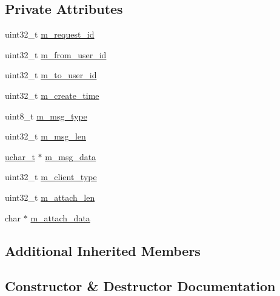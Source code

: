 \subsection*{Private Attributes}
\begin{DoxyCompactItemize}
\item 
uint32\+\_\+t \hyperlink{class_c_im_pdu_msg_data_a09b278fb291db3ac9e1a912ce2835b50}{m\+\_\+request\+\_\+id}
\item 
uint32\+\_\+t \hyperlink{class_c_im_pdu_msg_data_adf04af5060f9f17f9907c4111a5ec05a}{m\+\_\+from\+\_\+user\+\_\+id}
\item 
uint32\+\_\+t \hyperlink{class_c_im_pdu_msg_data_a0e5ed249696472f3feef4a7b4e54f7fc}{m\+\_\+to\+\_\+user\+\_\+id}
\item 
uint32\+\_\+t \hyperlink{class_c_im_pdu_msg_data_aa7e3ca2229da8320be355810c27ae355}{m\+\_\+create\+\_\+time}
\item 
uint8\+\_\+t \hyperlink{class_c_im_pdu_msg_data_a21c4d17025f90f353257cbee97def4a1}{m\+\_\+msg\+\_\+type}
\item 
uint32\+\_\+t \hyperlink{class_c_im_pdu_msg_data_a6785d8eb667b1cb82362ff77b86bf110}{m\+\_\+msg\+\_\+len}
\item 
\hyperlink{base_2ostype_8h_a124ea0f8f4a23a0a286b5582137f0b8d}{uchar\+\_\+t} $\ast$ \hyperlink{class_c_im_pdu_msg_data_ae93b7b416184b9bc60b1d3c2eab0e161}{m\+\_\+msg\+\_\+data}
\item 
uint32\+\_\+t \hyperlink{class_c_im_pdu_msg_data_a64a6e9613911a708d59957eef4c90f9d}{m\+\_\+client\+\_\+type}
\item 
uint32\+\_\+t \hyperlink{class_c_im_pdu_msg_data_ac1f3e70dc3144e162670648f0629faa5}{m\+\_\+attach\+\_\+len}
\item 
char $\ast$ \hyperlink{class_c_im_pdu_msg_data_a793754698b9246946094fd1bd722883e}{m\+\_\+attach\+\_\+data}
\end{DoxyCompactItemize}
\subsection*{Additional Inherited Members}


\subsection{Constructor \& Destructor Documentation}
\hypertarget{class_c_im_pdu_msg_data_ac2d2f2961b4322ee578b2e755c8687b4}{}
